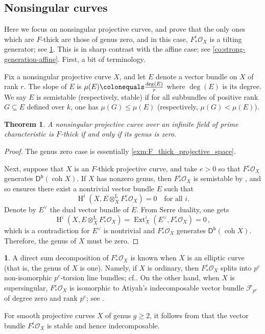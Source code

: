 \documentclass{amsart}
\newcommand{\coh}{\operatorname{coh}}
\newcommand{\dbcat}[1]{\cat{D}^{\mathsf{b}}(#1)}
\newcommand{\mco}{\mathcal{O}}
\newcommand{\cat}[1]{{\mathsf{#1}}}
\newcommand{\Ext}{\operatorname{Ext}}
\newcommand{\hh}{\operatorname{H}}
\newcommand{\lotimes}{\otimes^{\operatorname{L}}}
\newtheorem{theorem}[subsection]{Theorem}
\theoremstyle{definition}
\newtheorem{chunk}[subsection]{}
\theoremstyle{remark}
\numberwithin{equation}{subsection}
\begin{document}
\subsection*{Nonsingular curves}
Here we focus on nonsingular projective curves, and prove that the only ones which are $F$-thick are those of genus zero, and in this case, $F_*^e \mco_X$ is a tilting generator; see \cref{th:f_thick_curves}. This is in sharp contrast with the affine case; see \cref{co:strong-generation-affine}. First, a bit of terminology. 

Fix a nonsingular projective curve $X$, and let $E$ denote a vector bundle on $X$ of rank $r$. The slope of $E$ is $\mu(E ) \colonequals \frac{\deg(E )}{r}$ where $\deg(E)$ is its degree. We say $E$ is semistable (respectively, stable) if for all subbundles of positive rank $G \subseteq E $ defined over $k$, one has $\mu(G)\leq \mu(E)$ (respectively, $\mu(G) < \mu( E)$). 

\begin{theorem}
\label{th:f_thick_curves} 
A nonsingular projective curve over an infinite field of prime characteristic is $F$-thick if and only if its genus is zero.
\end{theorem}

\begin{proof}
The genus zero case is essentially \cref{exm:F_thick_projective_space}. 
	
Next, suppose that $X$ is an $F$-thick projective curve, and take $e>0$ so that $F_*^e\mco_X$ generates $\dbcat{\coh X}$. 
If $X$ has nonzero genus, then $F_*^e \mco_X$ is semistable by \cite[Corollary~4.4]{Sun:2008}, and so \cite[Theorem~1]{semistable_curves} ensures there exist a nontrivial vector bundle $E$ such that
\[
\hh^i(X, E\lotimes_{X} F_*^e \mco_X) =0\quad\text{for all $i$.}
\]
Denote by $E^\vee$ the dual vector bundle of $E$. From Serre duality, one gets
\[
\hh^i(X, E \lotimes_{X} F_*^e \mco_X) = \Ext^i_X(E ^\vee,F_*^e \mco_X)=0\,,
\]
which is a contradiction for $E^\vee$ is nontrivial and $F_*^e \mco_X$ generates $\dbcat{\coh X}$. Therefore, the genus of $X$ must be zero. 
\end{proof}
 
\begin{chunk}
A direct sum decomposition of $F_*^e \mco_X$ is known when $X$ is an elliptic curve (that is, the genus of $X$ is one). Namely, if $X$ is ordinary, then $F_*^e \mco_X$ splits into $p^e$ non-isomorphic $p^e$-torsion line bundles; cf.\@ \cite[Theorem~5.5]{Ejiri/Sannai:2016}. On the other hand, when $X$ is supersingular, $F_*^e \mco_X$ is isomorphic to Atiyah's indecomposable vector bundle $\mathcal{F}_{p^e}$ of degree zero and rank $p^e$; see \cite{Atiyah:1957}. 

For smooth projective curves $X$ of genus $g\geq 2$, it follows from \cite[Proposition~1.2]{LangePauly:2008} that the vector bundle $F_*^e \mco_X$ is stable and hence indecomposable.
\end{chunk}
 
\end{document}

